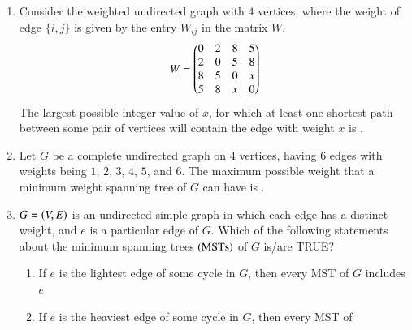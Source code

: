 \documentclass[journal,12pt,onecolumn]{IEEEtran}
\theoremstyle{remark}
\begin{document}
\begin{enumerate}
		\item Consider the weighted undirected graph with $4$ vertices, where the weight of edge $\{i, j\}$ is given by the entry $W_{ij}$ in the matrix $W$.
		\[
		W = \begin{pmatrix}
			0 & 2 & 8 & 5 \\
			2 & 0 & 5 & 8 \\
			8 & 5 & 0 & x \\
			5 & 8 & x & 0
		\end{pmatrix}
		\]
		The largest possible integer value of $x$, for which at least one shortest path between some pair of vertices will contain the edge with weight $x$ is \underline{\hspace{2cm}}.
		
		\hfill{}
		
		\item Let $G$ be a complete undirected graph on $4$ vertices, having $6$ edges with weights being $1$, $2$, $3$, $4$, $5$, and $6$. The maximum possible weight that a minimum weight spanning tree of $G$ can have is \underline{\hspace{2cm}}.
		
		\hfill{}
		
		\item $G = \left(V, E\right)$ is an undirected simple graph in which each edge has a distinct weight, and $e$ is a particular edge of $G$. Which of the following statements about the minimum spanning trees $\left(\text{MSTs}\right)$ of $G$ is/are TRUE?
		\begin{enumerate}
			\item If $e$ is the lightest edge of some cycle in $G$, then every MST of $G$ includes $e$
			\item If $e$ is the heaviest edge of some cycle in $G$, then every MST of 
		\end{enumerate}
		
		
		\end{enumerate}

	
\end{document}
